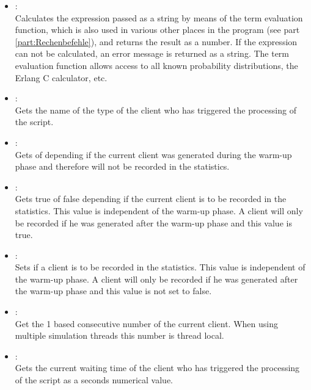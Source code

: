 \begin{itemize}

\item
{}:\\
Calculates the expression passed as a string by means of the term evaluation function,
which is also used in various other places in the program (see part \ref{part:Rechenbefehle}), and returns the result as a  number.
If the expression can not be calculated, an error message is returned as a string.
The term evaluation function allows access to all known probability distributions,
the Erlang C calculator, etc.

\item
{}:\\
Gets the name of the type of the client who has triggered the processing of the script.
  
\item
{}:\\
Gets  of  depending if the current client was generated during the warm-up phase and
therefore will not be recorded in the statistics.
  
\item
{}:\\
Gets true of false depending if the current client is to be recorded in the statistics.
This value is independent of the warm-up phase. A client will only be recorded if he was
generated after the warm-up phase and this value is true.
  
\item
{}:\\
Sets if a client is to be recorded in the statistics.
This value is independent of the warm-up phase. A client will only be recorded if he was
generated after the warm-up phase and this value is not set to false.
  
\item
{}:\\
Get the 1 based consecutive number of the current client.
When using multiple simulation threads this number is thread local.
  
\item
{}:\\
Gets the current waiting time of the client who has triggered the processing of the script as a seconds numerical value.
  

\end{itemize}
